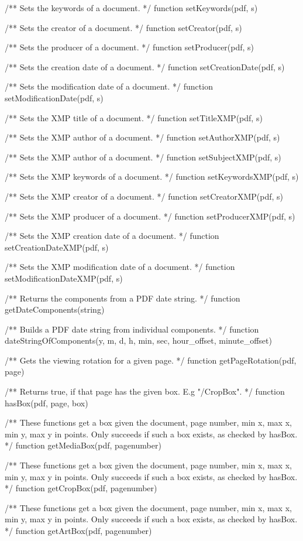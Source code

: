 /** Sets the keywords of a document. */
function setKeywords(pdf, s)

/** Sets the creator of a document. */
function setCreator(pdf, s)

/** Sets the producer of a document. */
function setProducer(pdf, s)

/** Sets the creation date of a document. */
function setCreationDate(pdf, s)

/** Sets the modification date of a document. */
function setModificationDate(pdf, s)

/** Sets the XMP title of a document. */
function setTitleXMP(pdf, s)

/** Sets the XMP author of a document. */
function setAuthorXMP(pdf, s)

/** Sets the XMP author of a document. */
function setSubjectXMP(pdf, s)

/** Sets the XMP keywords of a document. */
function setKeywordsXMP(pdf, s)

/** Sets the XMP creator of a document. */
function setCreatorXMP(pdf, s)

/** Sets the XMP producer of a document. */
function setProducerXMP(pdf, s)

/** Sets the XMP creation date of a document. */
function setCreationDateXMP(pdf, s)

/** Sets the XMP modification date of a document. */
function setModificationDateXMP(pdf, s)

/** Returns the components from a PDF date string. */
function getDateComponents(string)

/** Builds a PDF date string from individual components. */
function dateStringOfComponents(y, m, d, h, min, sec, hour_offset, minute_offset)

/** Gets the viewing rotation for a given page. */
function getPageRotation(pdf, page)

/** Returns true, if that page has the given box. E.g "/CropBox". */
function hasBox(pdf, page, box)

/** These functions get a box given the document, page number, min x, max x,
min y, max y in points. Only succeeds if such a box exists, as checked by
hasBox. */
function getMediaBox(pdf, pagenumber)

/** These functions get a box given the document, page number, min x, max x,
min y, max y in points. Only succeeds if such a box exists, as checked by
hasBox. */
function getCropBox(pdf, pagenumber)

/** These functions get a box given the document, page number, min x, max x,
min y, max y in points. Only succeeds if such a box exists, as checked by
hasBox. */
function getArtBox(pdf, pagenumber)

